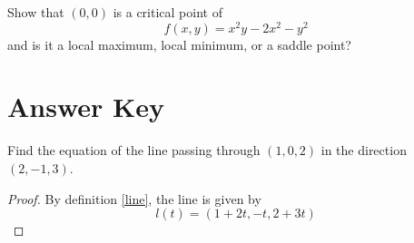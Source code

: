 \documentclass[openany]{book}
\DeclareMathOperator{\disc}{disc}
\begin{document}


\begin{prob}
    Show that $(0,0)$ is a critical point of
    \begin{equation*}
        f(x,y)=x^2y-2x^2-y^2
    \end{equation*}
    and is it a local maximum, local minimum, or a saddle point?
\end{prob}













\chapter{Answer Key}

\begin{prob}
    Find the equation of the line passing through $(1,0,2)$ in the direction $(2,-1,3)$.
\end{prob}
\begin{proof}
    By definition \ref{line}, the line is given by 
    \begin{equation*}
        l(t)=(1+2t, -t, 2+3t)
    \end{equation*}
\end{proof}
\end{document}
